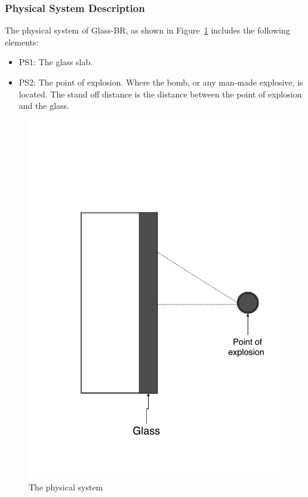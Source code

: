 \documentclass[12pt]{article}
\newcommand{\progname}{Glass-BR}
\begin{document}
\subsubsection{Physical System Description}

The physical system of \progname, as shown in Figure~\ref{Fig_PhysSyst} includes
the following elements:
\begin{itemize}
\item{PS1:} The glass slab.
\item{PS2:} The point of explosion.  Where the bomb, or any man-made explosive,
  is located. The stand off distance is the distance between the point of
  explosion and the glass.
\end{itemize}
 
\begin{figure}[h!]
  \begin{center}
    \includegraphics[scale=0.25]{physicalsystimage.pdf}
    \caption{The physical system}
    \label{Fig_PhysSyst}
  \end{center}
\end{figure}
\end{document}
